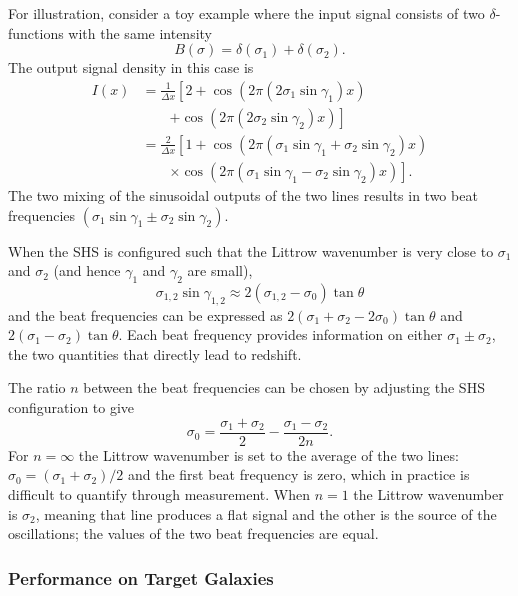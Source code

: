 \documentclass[preprint2, 10pt]{aastex}
\begin{document}
For illustration, consider a toy example where the input signal consists of two $\delta$-functions with the same intensity
\begin{equation}
B(\sigma)=\delta(\sigma_1)+\delta(\sigma_2).
\end{equation}
The output signal density in this case is
\begin{align}
I(x)&=\frac{1}{\Delta x}\left[2+ \cos{\left(2 \pi (2\sigma_1  \sin{\gamma_1})x \right)} \right. \nonumber \\
& \qquad \left.+ \cos{\left(2\pi (2  \sigma_2  \sin{\gamma_2})x \right)}\right]\\
&=\frac{2}{\Delta x}\left[1+ \cos{\left(2 \pi  (\sigma_1  \sin{\gamma_1}+ \sigma_2  \sin{\gamma_2})x \right)}  \right. \nonumber \\
& \qquad \left. \times\cos{\left(2\pi  (\sigma_1  \sin{\gamma_1}- \sigma_2  \sin{\gamma_2})x\right)}\right].
\end{align}
The two mixing of the sinusoidal outputs of the two lines results in two beat frequencies $(\sigma_1  \sin{\gamma_1}\pm\sigma_2  \sin{\gamma_2})$.

When the SHS is configured such that the Littrow wavenumber is
very close to $\sigma_1$ and $\sigma_2$ (and hence $\gamma_1$ and $\gamma_2$
are small),
\begin{equation}
\sigma_{1,2}\sin{\gamma_{1,2}} \approx  2(\sigma_{1,2}-\sigma_0) \tan{\theta}
\end{equation}
and the beat frequencies can be expressed as
$2(\sigma_1+\sigma_2-2\sigma_0)\tan{\theta}$ and $2(\sigma_1-\sigma_2)\tan{\theta}$.
Each beat frequency provides information on either 
$\sigma_1\pm \sigma_2$, the two quantities that directly lead to redshift.

The ratio $n$ between the beat frequencies can be chosen by adjusting the SHS configuration to give
\begin{equation}
\sigma_0=\frac{\sigma_1+\sigma_2}{2}-\frac{\sigma_1-\sigma_2}{2n}.
\label{littrowchoices:eqn}
\end{equation}
For $n=\infty$  the Littrow wavenumber is set to the average of the two lines: $\sigma_0=(\sigma_1+\sigma_2)/2$ and the first beat frequency is zero,
which in practice is difficult to quantify through measurement.  When $n=1$ the Littrow wavenumber is $\sigma_2$, meaning that line produces a flat signal and the other is the source
of the oscillations; the values of the two beat frequencies are equal.


\subsubsection{Performance on Target Galaxies}
\end{document}
